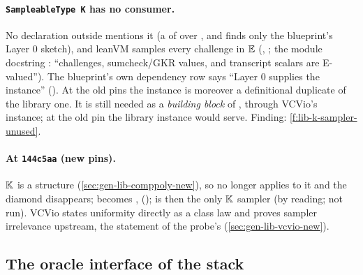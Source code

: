\paragraph{\texorpdfstring{\texttt{SampleableType K}}{SampleableType K} has no consumer.} No
declaration outside \allowbreak{} mentions it (a  of 
over ,  and  finds only the blueprint's Layer 0 sketch), and
leanVM samples every challenge in $\mathbb{E}$ (\allowbreak{}\allowbreak{}\allowbreak{},
; the module docstring
\allowbreak{}\allowbreak{}\allowbreak{}\allowbreak{}: \enquote{challenges, sumcheck/GKR values, and
transcript scalars are E-valued}). The blueprint's own dependency row says \enquote{Layer 0
supplies the  instance} (). At the old pins the instance
is moreover a definitional duplicate of the library one. It is still needed as a \emph{building
block} of , through VCVio's  instance; at the old pin the
library  instance would serve. Finding: \cref{f:lib-k-sampler-unused}.

\paragraph{At \texorpdfstring{\texttt{144c5aa}}{144c5aa} (new pins).} $\mathbb{K}$ is a structure
(\cref{sec:gen-lib-comppoly-new}), so  no longer applies to it and the
diamond disappears;  becomes
\allowbreak{}\allowbreak{}, \allowbreak{}\allowbreak{}
();  is
then the only $\mathbb{K}$ sampler (by reading; not run). VCVio  states uniformity directly
as a class law and proves sampler irrelevance upstream, the statement of the probe's
 (\cref{sec:gen-lib-vcvio-new}).

\subsection{The oracle interface of the stack}\label{sec:gen-l0-oracle}

